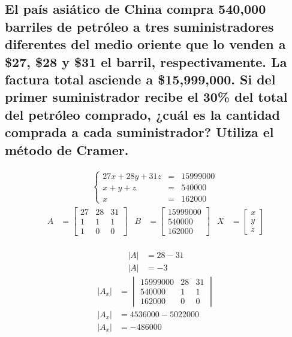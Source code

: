 \documentclass[10pt, a4paper]{article}
\begin{document}
\subsection{
El país asiático de China compra 540,000 barriles de petróleo a tres suministradores diferentes del medio oriente que lo venden a \$27, \$28 y \$31 el barril, respectivamente. La factura total asciende a \$15,999,000. Si del primer suministrador recibe el 30\% del total del petróleo comprado, ¿cuál es la cantidad comprada a cada suministrador? Utiliza el método de Cramer.
}
  \columnseprule=1pt
\begin{align*}
  \left\{
  \begin{array}{rcl}
    27x + 28y + 31z &= &15999000\\
    x + y + z &= &540000\\
    x &= &162000
  \end{array}
  \right.\
\end{align*}
\begin{align*}
  A &= \begin{bmatrix}
    27 & 28 & 31\\
    1 & 1 & 1\\
    1 & 0 & 0
  \end{bmatrix}&
  B &= \begin{bmatrix}
    15999000\\
    540000\\
    162000
  \end{bmatrix}&
  X &= \begin{bmatrix}
    x\\
    y\\
    z
  \end{bmatrix}
\end{align*}
\\
\begin{align*}
  \left|A\right| &= 28-31\\
  \left|A\right| &= -3
\end{align*}
\begin{align*}
  \left|A_x\right| &= \begin{vmatrix}
    15999000 & 28 & 31\\
    540000 & 1 & 1\\
    162000 & 0 & 0
  \end{vmatrix}\\
  \left|A_x\right| &= 4536000 - 5022000\\
  \left|A_x\right| &= -486000
\end{align*}
\end{document}
